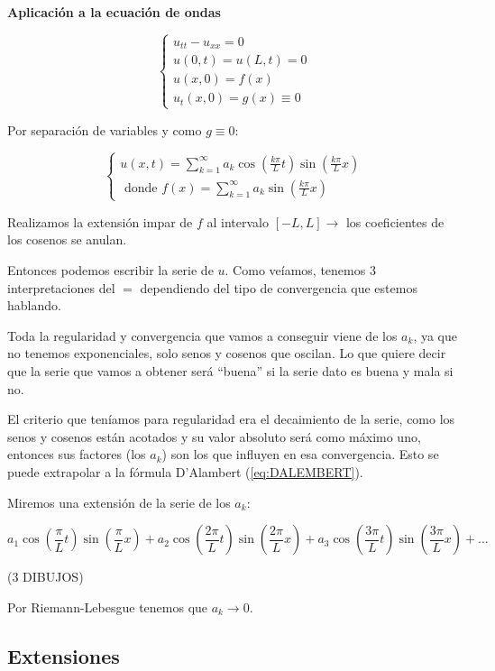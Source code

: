 		\textbf{Aplicación a la ecuación de ondas}

			\[  \begin{cases}
				u_{tt} - u_{xx} = 0 \\
				u(0,t) = u(L,t) = 0 \\
				u(x,0) = f(x) \\
				u_t(x,0) = g(x) \equiv 0
				\end{cases}
			\]

			Por separación de variables y como $g \equiv 0$:

			\[
			\begin{cases}
				u(x,t) = \sum_{k=1}^\infty a_k \cos(\frac{k\pi}{L}t) \sin(\frac{k\pi}{L}x) \\
				\text{ donde } f(x) = \sum_{k=1}^\infty a_k \sin(\frac{k\pi}{L}x)
			\end{cases}
			\]

			Realizamos la extensión impar de $f$ al intervalo $[-L,L] \rightarrow$ los coeficientes de los cosenos se anulan.

			Entonces podemos escribir la serie de $u$. Como veíamos, tenemos 3 interpretaciones del $=$ dependiendo del tipo de convergencia que estemos hablando.

			Toda la regularidad y convergencia que vamos a conseguir viene de los $a_k$, ya que no tenemos exponenciales, solo senos y cosenos que oscilan. Lo que quiere decir que la serie que vamos a obtener será ``buena'' si la serie dato es buena y mala si no.

			El criterio que teníamos para regularidad era el decaimiento de la serie, como los senos y cosenos están acotados y su valor absoluto será como máximo uno, entonces sus factores (los $a_k$) son los que influyen en esa convergencia. Esto se puede extrapolar a la fórmula D'Alambert (\ref{eq:DALEMBERT}).


			Miremos una extensión de la serie de los $a_k$:

			\[a_1 \cos\left(\frac{\pi}{L}t \right) \sin\left(\frac{\pi}{L}x \right) + a_2 \cos\left(\frac{2\pi}{L}t \right) \sin\left(\frac{2\pi}{L}x \right) + a_3 \cos\left(\frac{3\pi}{L}t \right) \sin\left(\frac{3\pi}{L}x \right) + …\]


			(3 DIBUJOS)


			Por Riemann-Lebesgue tenemos que $a_k \to 0$.

	\subsection{Extensiones}

